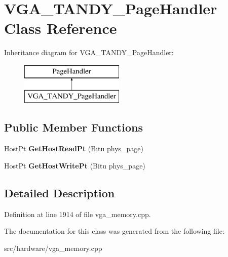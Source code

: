 \hypertarget{classVGA__TANDY__PageHandler}{\section{V\-G\-A\-\_\-\-T\-A\-N\-D\-Y\-\_\-\-Page\-Handler Class Reference}
\label{classVGA__TANDY__PageHandler}
}
Inheritance diagram for V\-G\-A\-\_\-\-T\-A\-N\-D\-Y\-\_\-\-Page\-Handler\-:\begin{figure}[H]
\begin{center}
\leavevmode
\includegraphics[height=2.000000cm]{classVGA__TANDY__PageHandler}
\end{center}
\end{figure}
\subsection*{Public Member Functions}
\begin{DoxyCompactItemize}
\item 
\hypertarget{classVGA__TANDY__PageHandler_a8c39c6f07a7c47fa66839f49dbac7585}{Host\-Pt {\bfseries Get\-Host\-Read\-Pt} (Bitu phys\-\_\-page)}\label{classVGA__TANDY__PageHandler_a8c39c6f07a7c47fa66839f49dbac7585}

\item 
\hypertarget{classVGA__TANDY__PageHandler_aa7f32d214017a07179bc6b8187028e69}{Host\-Pt {\bfseries Get\-Host\-Write\-Pt} (Bitu phys\-\_\-page)}\label{classVGA__TANDY__PageHandler_aa7f32d214017a07179bc6b8187028e69}

\end{DoxyCompactItemize}


\subsection{Detailed Description}


Definition at line 1914 of file vga\-\_\-memory.\-cpp.



The documentation for this class was generated from the following file\-:\begin{DoxyCompactItemize}
\item 
src/hardware/vga\-\_\-memory.\-cpp\end{DoxyCompactItemize}
